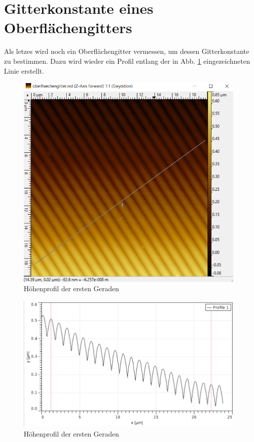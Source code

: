 
\clearpage
\section{Gitterkonstante eines Oberflächengitters}

Als letzes wird noch ein Oberflächengitter vermessen, um dessen Gitterkonstante zu bestimmen. Dazu wird wieder ein Profil entlang der in 
Abb. \ref{bild:OFGitter} eingezeichneten Linie erstellt.

\begin{figure}[h]
    \centering
    \includegraphics[scale = 0.45]{Bilder/OFGitter.png}
    \caption{Höhenprofil der ersten Geraden}
    \label{bild:OFGitter}
\end{figure}

\begin{figure}[ht]
    \centering
    \includegraphics[scale = 0.55]{Bilder/OFGitterProfil.png}
    \caption{Höhenprofil der ersten Geraden}
    \label{bild:OFGitterProfil}
\end{figure}


